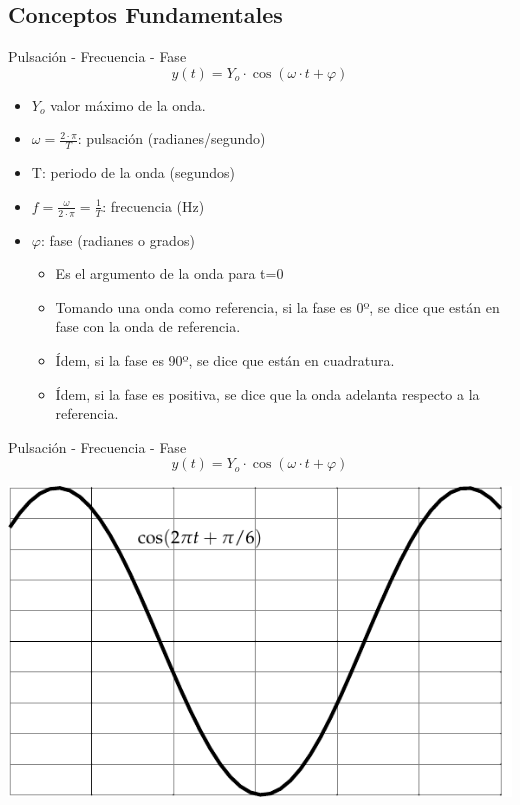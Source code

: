\documentclass[xcolor={usenames,svgnames,dvipsnames}]{beamer}
\begin{document}
\subsection{Conceptos Fundamentales}
\label{sec:org397ab4d}

\begin{frame}[label={sec:org681cc76}]{Pulsación - Frecuencia - Fase}
\[
y(t)=Y_{o}\cdot\cos(\omega\cdot t+\varphi)
\]

\begin{itemize}
\item \(Y_{o}\) valor máximo de la onda.

\item \(\omega=\frac{2\cdot\pi}{T}\): pulsación (radianes/segundo)

\item T: periodo de la onda (segundos)

\item \(f=\frac{\omega}{2\cdot\pi}=\frac{1}{T}\): frecuencia (Hz)

\item \(\varphi\): fase (radianes o grados)

\begin{itemize}
\item Es el argumento de la onda para t=0

\item Tomando una onda como referencia, si la fase es 0º, se dice que
están en fase con la onda de referencia.

\item Ídem, si la fase es 90º, se dice que están en cuadratura.

\item Ídem, si la fase es positiva, se dice que la onda adelanta
respecto a la referencia.
\end{itemize}
\end{itemize}
\end{frame}

\begin{frame}[label={sec:org727b55c}]{Pulsación - Frecuencia - Fase}
$$y(t)=Y_{o}\cdot\cos(\omega\cdot t+\varphi)$$

\begin{center}
\includegraphics[width=.9\linewidth]{../figs/Sin.pdf}
\end{center}
\end{frame}
\end{document}
